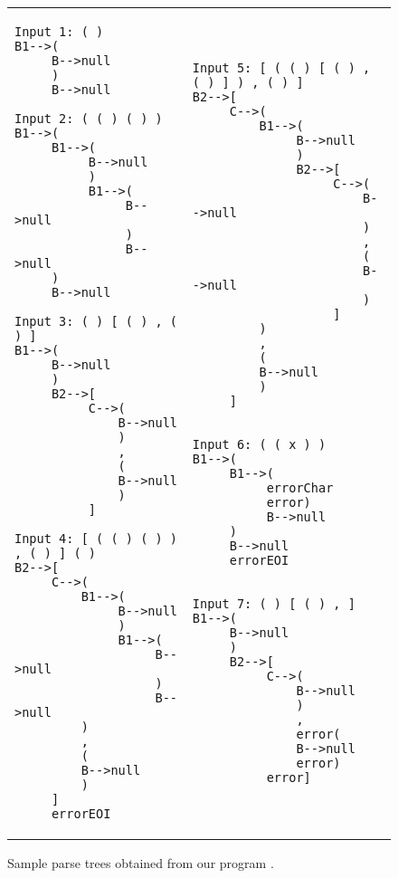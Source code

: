 \begin{figure}[p]
{\footnotesize
\begin{tabular}{ll}
\begin{minipage}{3in}
\begin{verbatim}
Input 1: ( )
B1-->(
     B-->null
     )
     B-->null

Input 2: ( ( ) ( ) )
B1-->(
     B1-->(
          B-->null
          )
          B1-->(
               B-->null
               )
               B-->null
     )
     B-->null

Input 3: ( ) [ ( ) , ( ) ]
B1-->(
     B-->null
     )
     B2-->[
          C-->(
              B-->null
              )
              ,
              (
              B-->null
              )
          ]

Input 4: [ ( ( ) ( ) ) , ( ) ] ( )
B2-->[
     C-->(
         B1-->(
              B-->null
              )
              B1-->(
                   B-->null
                   )
                   B-->null
         )
         ,
         (
         B-->null
         )
     ]
     errorEOI
\end{verbatim}
\end{minipage} & \hspace*{-4ex}
\begin{minipage}{3.5in}
\begin{verbatim}
Input 5: [ ( ( ) [ ( ) , ( ) ] ) , ( ) ]
B2-->[
     C-->(
         B1-->(
              B-->null
              )
              B2-->[
                   C-->(
                       B-->null
                       )
                       ,
                       (
                       B-->null
                       )
                   ]
         )
         ,
         (
         B-->null
         )
     ]


Input 6: ( ( x ) )
B1-->(
     B1-->(
          errorChar
          error)
          B-->null
     )
     B-->null
     errorEOI


Input 7: ( ) [ ( ) , ]
B1-->(
     B-->null
     )
     B2-->[
          C-->(
              B-->null
              )
              ,
              error(
              B-->null
              error)
          error]
\end{verbatim} 
\end{minipage} 
\end{tabular} }
\caption{Sample parse trees obtained from our program .}
\label{fig:parseoutput}
\end{figure}
